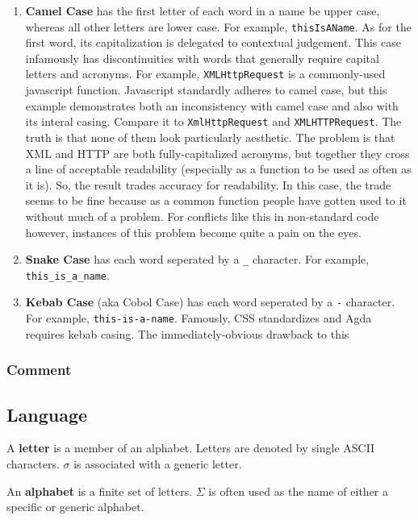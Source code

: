 \documentclass{article}
\newcommand{\definition}[1]{
	\vspace{5px}
	\noindent {\sc Definition.} #1
	\vspace{5px}
}
\newcommand{\code}[1]{\texttt{#1}}
\begin{document}
	\begin{enumerate}
		\item \textbf{Camel Case} has the first letter of each word in a name be upper case, whereas all other letters are lower case. For example, \code{thisIsAName}. As for the first word, its capitalization is delegated to contextual judgement. This case infamously has discontinuities with words that generally require capital letters and acronyms. For example, \code{XMLHttpRequest} is a commonly-used javascript function. Javascript standardly adheres to camel case, but this example demonstrates both an inconsistency with camel case and also with its interal casing. Compare it to \code{XmlHttpRequest} and \code{XMLHTTPRequest}. The truth is that none of them look particularly aesthetic. The problem is that XML and HTTP are both fully-capitalized acronyms, but together they cross a line of acceptable readability (especially as a function to be used as often as it is). So, the result trades accuracy for readability. In this case, the trade seems to be fine because as a common function people have gotten used to it without much of a problem. For conflicts like this in non-standard code however, instances of this problem become quite a pain on the eyes.

		\item \textbf{Snake Case} has each word seperated by a \code{_} character. For example, \code{this_is_a_name}.
		
		\item \textbf{Kebab Case} (aka Cobol Case) has each word seperated by a \code{-} character. For example, \code{this-is-a-name}. Famously, CSS standardizes and Agda requires kebab casing. The immediately-obvious drawback to this
	\end{enumerate}

\subsubsection{Comment}


\subsection{Language}

	\definition{A \textbf{letter} is a member of an alphabet. Letters are denoted by single ASCII characters. $\sigma$ is associated with a generic letter.}

	\definition{An \textbf{alphabet} is a finite set of letters. $\Sigma$ is often used as the name of either a specific or generic alphabet.}
\end{document}
